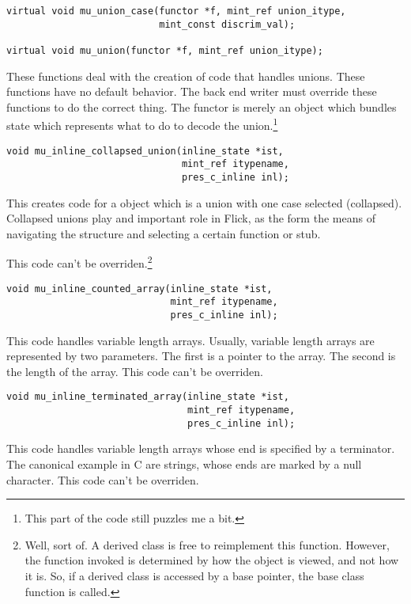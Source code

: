 \begin{verbatim}
virtual void mu_union_case(functor *f, mint_ref union_itype,
                           mint_const discrim_val);

virtual void mu_union(functor *f, mint_ref union_itype);
\end{verbatim}

These functions deal with the creation of code that handles unions.  These
functions have no default behavior.  The back end writer must override these
functions to do the correct thing.  The functor is merely an object which
bundles state which represents what to do to decode the union.\footnote{This
part of the code still puzzles me a bit.}

\begin{verbatim}
void mu_inline_collapsed_union(inline_state *ist,
                               mint_ref itypename,
                               pres_c_inline inl);
\end{verbatim}

This creates code for a object which is a union with one case selected
(collapsed).  Collapsed unions play and important role in Flick, as the form
the means of navigating the \cpres{} structure and selecting a certain function
or stub.

This code can't be overriden.\footnote{Well, sort of.  A derived class is free
to reimplement this function.  However, the function invoked is determined by
how the object is viewed, and not how it is.  So, if a derived class is
accessed by a base pointer, the base class function is called.}

\begin{verbatim}
void mu_inline_counted_array(inline_state *ist,
                             mint_ref itypename,
                             pres_c_inline inl);
\end{verbatim}

This code handles variable length arrays.  Usually, variable length arrays are
represented by two parameters.  The first is a pointer to the array.  The
second is the length of the array.  This code can't be overriden.

\begin{verbatim}
void mu_inline_terminated_array(inline_state *ist,
                                mint_ref itypename,
                                pres_c_inline inl);
\end{verbatim}

This code handles variable length arrays whose end is specified by a
terminator.  The canonical example in C are strings, whose ends are marked by a
null character.  This code can't be overriden.

